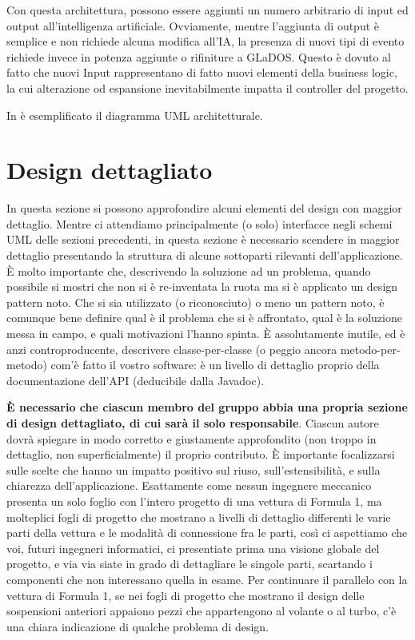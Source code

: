 \documentclass[a4paper,12pt]{report}
\begin{document}
	Con questa architettura, possono essere aggiunti un numero arbitrario di input ed output
	all'intelligenza artificiale.
	Ovviamente, mentre l'aggiunta di output è semplice e non richiede alcuna modifica all'IA, la
	presenza di nuovi tipi di evento richiede invece in potenza aggiunte o rifiniture a GLaDOS.
	Questo è dovuto al fatto che nuovi Input rappresentano di fatto nuovi elementi della business
	logic, la cui alterazione od espansione inevitabilmente impatta il controller del progetto.
	
	In  è esemplificato il diagramma UML architetturale.
	
	
	\section{Design dettagliato}
	
	In questa sezione si possono approfondire alcuni elementi del design con maggior dettaglio.
	Mentre ci attendiamo principalmente (o solo) interfacce negli schemi UML delle sezioni precedenti,
	in questa sezione è necessario scendere in maggior dettaglio presentando la struttura di alcune sottoparti rilevanti dell'applicazione.
	È molto importante che, descrivendo la soluzione ad un problema, quando possibile si mostri che non si è re-inventata la ruota ma si è applicato un design pattern noto.
	Che si sia utilizzato (o riconosciuto) o meno un pattern noto, è comunque bene definire qual è il problema che si è affrontato, qual è la soluzione messa in campo, e quali motivazioni l'hanno spinta.
	È assolutamente inutile, ed è anzi controproducente, descrivere classe-per-classe (o peggio ancora metodo-per-metodo) com'è fatto il vostro software: è un livello di dettaglio proprio della documentazione dell'API (deducibile dalla Javadoc).
	
	\textbf{È necessario che ciascun membro del gruppo abbia una propria sezione di design dettagliato,
		di cui sarà il solo responsabile}.
	Ciascun autore dovrà spiegare in modo corretto e giustamente approfondito (non troppo in dettaglio, non superficialmente) il proprio contributo.
	È importante focalizzarsi sulle scelte che hanno un impatto positivo sul riuso, sull'estensibilità, e sulla chiarezza dell'applicazione.
	Esattamente come nessun ingegnere meccanico presenta un solo foglio con l'intero progetto di una vettura di Formula 1, ma molteplici fogli di progetto che mostrano a livelli di dettaglio differenti le varie parti della vettura e le modalità di connessione fra le parti, così ci aspettiamo che voi, futuri ingegneri informatici, ci presentiate prima una visione globale del progetto, e via via siate in grado di dettagliare le singole parti, scartando i componenti che non interessano quella in esame.
	Per continuare il parallelo con la vettura di Formula 1, se nei fogli di progetto che mostrano il
	design delle sospensioni anteriori appaiono pezzi che appartengono al volante o al turbo, c'è una
	chiara indicazione di qualche problema di design.
	
\end{document}
